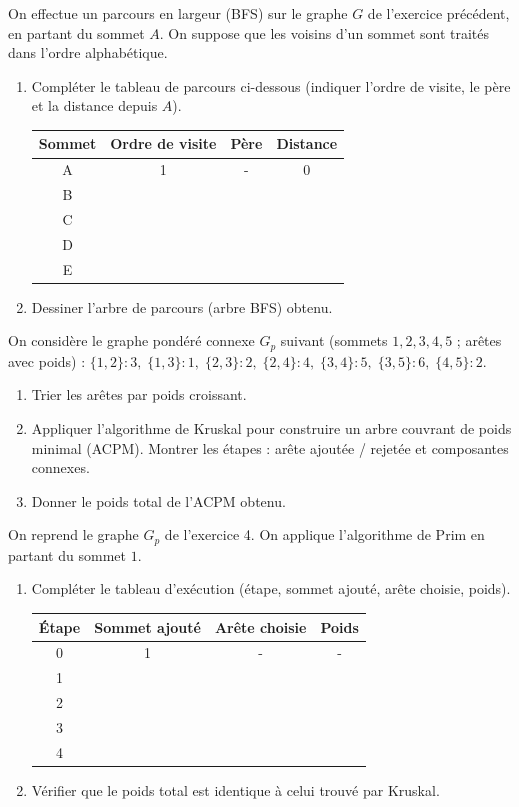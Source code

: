 \documentclass[11pt]{article}
\begin{document}
\begin{exercice}
On effectue un parcours en largeur (BFS) sur le graphe $G$ de l'exercice précédent, en partant du sommet $A$. On suppose que les voisins d'un sommet sont traités dans l'ordre alphabétique.
\begin{enumerate}
    \item Compléter le tableau de parcours ci-dessous (indiquer l'ordre de visite, le père et la distance depuis $A$).
    \begin{tabular}{|c|c|c|c|}
    \hline Sommet & Ordre de visite & Père & Distance \\ \hline
    A & 1 & - & 0 \\ \hline
    B & & & \\ \hline
    C & & & \\ \hline
    D & & & \\ \hline
    E & & & \\ \hline
    \end{tabular}
    \item Dessiner l'arbre de parcours (arbre BFS) obtenu.
\end{enumerate}
\end{exercice}

\begin{exercice}
On considère le graphe pondéré connexe $G_p$ suivant (sommets $1,2,3,4,5$ ; arêtes avec poids) :
$\{1,2\}:3,\; \{1,3\}:1,\; \{2,3\}:2,\; \{2,4\}:4,\; \{3,4\}:5,\; \{3,5\}:6,\; \{4,5\}:2$.
\begin{enumerate}
    \item Trier les arêtes par poids croissant.
    \item Appliquer l'algorithme de Kruskal pour construire un arbre couvrant de poids minimal (ACPM). Montrer les étapes : arête ajoutée / rejetée et composantes connexes.
    \item Donner le poids total de l'ACPM obtenu.
\end{enumerate}
\end{exercice}

\begin{exercice}
On reprend le graphe $G_p$ de l'exercice 4. On applique l'algorithme de Prim en partant du sommet $1$.
\begin{enumerate}
    \item Compléter le tableau d'exécution (étape, sommet ajouté, arête choisie, poids).
    \begin{tabular}{|c|c|c|c|}
    \hline Étape & Sommet ajouté & Arête choisie & Poids \\ \hline
    0 & 1 & - & - \\ \hline
    1 & & & \\ \hline
    2 & & & \\ \hline
    3 & & & \\ \hline
    4 & & & \\ \hline
    \end{tabular}
    \item Vérifier que le poids total est identique à celui trouvé par Kruskal.
\end{enumerate}
\end{exercice}
\end{document}
